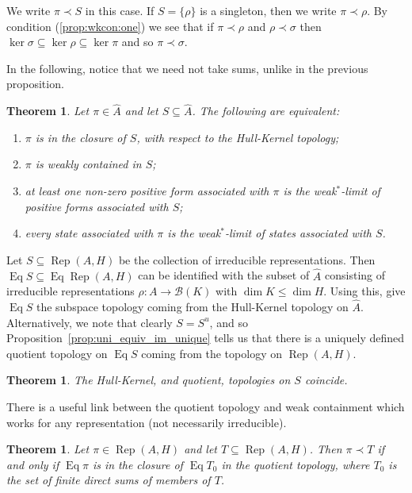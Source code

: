 \documentclass[a4paper,11pt]{article}
\newcommand{\mc}[1]{{\mathcal{#1}}}
\newcommand{\Rep}{\operatorname{Rep}}
\newcommand{\Eq}{\operatorname{Eq}}
\newtheorem{theorem}[lemma]{Theorem}
\begin{document}
We write $\pi \prec S$ in this case.  If $S=\{\rho\}$ is a singleton, then we
write $\pi\prec\rho$.  By condition (\ref{prop:wkcon:one}) we see that if
$\pi\prec\rho$ and $\rho\prec\sigma$ then $\ker\sigma \subseteq \ker\rho
\subseteq\ker\pi$ and so $\pi\prec\sigma$.

In the following, notice that we need not take sums, unlike in the previous
proposition.

\begin{theorem}\label{thm:wk-con-irrep}
Let $\pi\in\hat A$ and let $S\subseteq\hat A$.  The following are equivalent:
\begin{enumerate}
\item $\pi$ is in the closure of $S$, with respect to the Hull-Kernel
topology;
\item $\pi$ is weakly contained in $S$;
\item at least one non-zero positive form associated with $\pi$ is the
weak$^*$-limit of positive forms associated with $S$;
\item every state associated with $\pi$ is the weak$^*$-limit of states
associated with $S$.
\end{enumerate}
\end{theorem}

Let $S\subseteq\Rep(A,H)$ be the collection of irreducible representations.
Then $\Eq S \subseteq \Eq\Rep(A,H)$ can be identified
with the subset of $\hat A$ consisting of irreducible representations
$\rho:A\rightarrow\mc B(K)$ with $\dim K\leq\dim H$.  Using this, give
$\Eq S$ the subspace topology coming from the Hull-Kernel topology on $\hat A$.
Alternatively, we note that clearly $S = S^u$, and so
Proposition~\ref{prop:uni_equiv_im_unique} tells us that there is a
uniquely defined quotient topology on $\Eq S$ coming from the topology
on $\Rep(A,H)$.

\begin{theorem}
The Hull-Kernel, and quotient, topologies on $S$ coincide.
\end{theorem}

There is a useful link between the quotient topology and weak containment which
works for any representation (not necessarily irreducible).

\begin{theorem}\label{thm:top_wk_con}
Let $\pi\in\Rep(A,H)$ and let $T\subseteq\Rep(A,H)$.  Then $\pi \prec T$ if
and only if $\Eq\pi$ is in the closure of $\Eq T_0$ in the quotient topology,
where $T_0$ is the set of finite direct sums of members of $T$.
\end{theorem}
\end{document}
